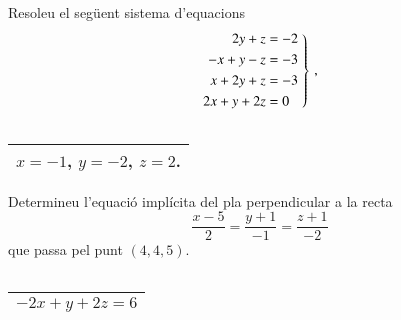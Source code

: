 \documentclass[11pt,catalan]{article}
\begin{document}
\begin{enunciat}
Resoleu el següent sistema d'equacions
\[
  \left.\aligned 2 y + z &= -2 \\ - x + y - z &= -3 \\ x + 2 y + z &= -3 \\ 2 x + y + 2 z &= 0 \endaligned\;\right\}\,,
\]
\end{enunciat}

\begin{quadricula}
\begin{tabular}{|C{5cm}{0.5cm}|}
\hline
  \\
\hline
\end{tabular}
\end{quadricula}

\begin{solucio}
\begin{center}
\begin{tabular}{|C{5cm}{0.5cm}|}
\hline
$x=-1$, $y=-2$, $z=2$. \\
\hline
\end{tabular}
\end{center}
\end{solucio}


\begin{enunciat}
Determineu l'equació implícita del pla perpendicular a la recta 
\[
  \frac{x - 5}{2} = \frac{y + 1}{-1} = \frac{z + 1}{-2}
\]
que passa pel punt $(4,4,5)$.
\end{enunciat}

\begin{quadricula}
\begin{tabular}{|C{5cm}{0.5cm}|}
\hline
  \\
\hline
\end{tabular}
\end{quadricula}

\begin{solucio}
\begin{center}
\begin{tabular}{|C{5cm}{0.5cm}|}
\hline
$- 2 x + y + 2 z = 6$ \\
\hline
\end{tabular}
\end{center}
\end{solucio}
\end{document}
